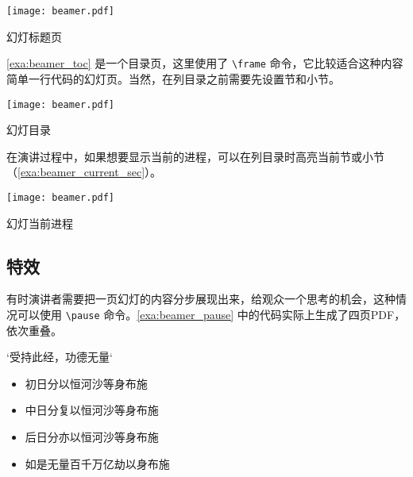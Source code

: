 \begin{example}[h]
\begin{Demo}
\centering
\texttt{[image: beamer.pdf]}
\end{Demo}
\caption{幻灯标题页}
\label{exa:beamer_titlepage}
\end{example}

\autoref{exa:beamer_toc} 是一个目录页，这里使用了 \verb|\frame| 命令，它比较适合这种内容简单一行代码的幻灯页。当然，在列目录之前需要先设置节和小节。

\begin{example}[!h]
\begin{FBTDemo}[numbers=none]{
\centering
\texttt{[image: beamer.pdf]}
}
\frame{\tableofcontents}
\end{FBTDemo}
\caption{幻灯目录}
\label{exa:beamer_toc}
\end{example}

在演讲过程中，如果想要显示当前的进程，可以在列目录时高亮当前节或小节（\autoref{exa:beamer_current_sec}）。

\begin{example}[!h]
\begin{FBTDemo}[numbers=none]{
\centering
\texttt{[image: beamer.pdf]}
}
\frame{\tableofcontents[currentsection]}
\end{FBTDemo}
\caption{幻灯当前进程}
\label{exa:beamer_current_sec}
\end{example}

\subsection{特效}

有时演讲者需要把一页幻灯的内容分步展现出来，给观众一个思考的机会，这种情况可以使用 \verb|\pause| 命令。\autoref{exa:beamer_pause} 中的代码实际上生成了四页PDF，依次重叠。

\begin{Code}[]
\begin{frame}{`受持此经，功德无量`}
\begin{itemize}
    \item 初日分以恒河沙等身布施
    \pause
    \item 中日分复以恒河沙等身布施
    \pause
    \item 后日分亦以恒河沙等身布施
    \pause
    \item 如是无量百千万亿劫以身布施
\end{itemize}
\end{frame}
\end{Code}

